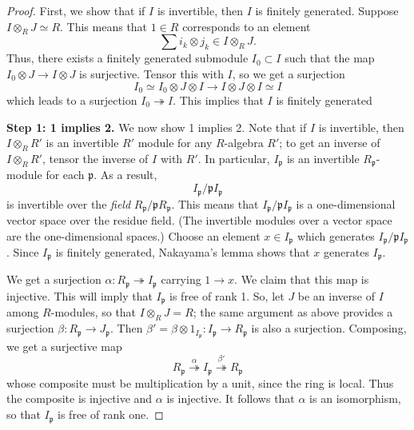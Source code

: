 \begin{proof} 
First, we show that if $I$ is invertible, then $I$ is finitely generated. 
Suppose $I \otimes_R J \simeq R$. This means that $1 \in R$ corresponds to an
element
\[ \sum i_k \otimes j_k \in I \otimes_R J .  \]
Thus, there exists a finitely generated submodule $I_0\subset I$ such that the map $I_0 \otimes J \to I
\otimes J$ is surjective. Tensor this with $I$, so we get a surjection
\[ I_0 \simeq I_0 \otimes J \otimes I \to I \otimes J \otimes I \simeq I  \]
which leads to a surjection $I_0 \twoheadrightarrow I$. This implies that $I$
is finitely generated 

\textbf{Step 1: 1 implies 2.}
We now show 1 implies 2. Note that if $I$ is invertible, then $I \otimes_R R'$
is an invertible $R'$ module for any $R$-algebra $R'$; to get an inverse of
$I \otimes_R R'$,
tensor the inverse of $I$ with $R'$.
In particular, $I_{\mathfrak{p}}$ is an invertible $R_{\mathfrak{p}}$-module
for each $\mathfrak{p}$. As a result, 
\[ I_{\mathfrak{p}}/\mathfrak{p} I_{\mathfrak{p}}  \]
is invertible over the \emph{field} $R_{\mathfrak{p}}/\mathfrak{p}R_{\mathfrak{p}}$. This means
that 
$ I_{\mathfrak{p}}/\mathfrak{p} I_{\mathfrak{p}}$ is a one-dimensional vector
space over the residue field. (The invertible modules over a vector space are
the one-dimensional spaces.)
Choose an element $x \in I_{\mathfrak{p}}$ which generates
$I_{\mathfrak{p}}/\mathfrak{p}I_{\mathfrak{p}}$.  Since $I_{\mathfrak{p}}$ is
finitely generated, Nakayama's lemma shows that $x$ generates $I_{\mathfrak{p}}$.

We get a surjection $\alpha: R_{\mathfrak{p}} \twoheadrightarrow I_{\mathfrak{p}}$
carrying $1 \to x$.  We claim that this map is injective.
This will imply that $I_{\mathfrak{p}}$ is free of rank 1. So, let $J$ be an
inverse of $I$ among $R$-modules, so that $I \otimes_R J = R$; the same
argument as above provides a surjection
$ \beta: {R}_{\mathfrak{p}} \to J_{\mathfrak{p}}$. 
Then $\beta' = \beta \otimes 1_{I_{\mathfrak{p}}}: I_{\mathfrak{p}} \to
R_{\mathfrak{p}}$ is also a surjection.
Composing, we get a surjective map
\[ R_{\mathfrak{p}} \stackrel{\alpha}{\twoheadrightarrow} I_{\mathfrak{p}}
\stackrel{\beta'}{\twoheadrightarrow} R_{\mathfrak{p}}  \]
whose composite must be multiplication by a unit, since the ring is local. Thus
the composite is injective and $\alpha$ is injective. 
It follows that $\alpha$ is an isomorphism, so that $I_{\mathfrak{p}}$ is free
of rank one.


\end{proof}
